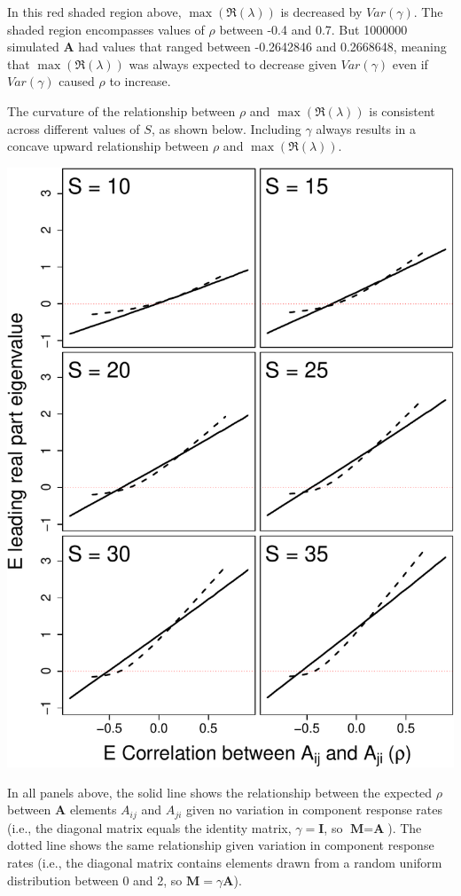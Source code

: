 \documentclass[]{article}
\begin{document}
In this red shaded region above, \(\max(\Re(\lambda))\) is decreased by
\(Var(\gamma)\). The shaded region encompasses values of \(\rho\)
between -0.4 and 0.7. But 1000000 simulated \(\textbf{A}\) had values
that ranged between -0.2642846 and 0.2668648, meaning that
\(\max(\Re(\lambda))\) was always expected to decrease given
\(Var(\gamma)\) even if \(Var(\gamma)\) caused \(\rho\) to increase.

The curvature of the relationship between \(\rho\) and
\(\max(\Re(\lambda))\) is consistent across different values of \(S\),
as shown below. Including \(\gamma\) always results in a concave upward
relationship between \(\rho\) and \(\max(\Re(\lambda))\).

\includegraphics{revision_notes_files/figure-latex/unnamed-chunk-13-1.pdf}

In all panels above, the solid line shows the relationship between the
expected \(\rho\) between \(\textbf{A}\) elements \(A_{ij}\) and
\(A_{ji}\) given no variation in component response rates (i.e., the
diagonal matrix equals the identity matrix, \(\gamma = \textbf{I}\), so
\(\textbf{M} = \textbf{A}\)). The dotted line shows the same
relationship given variation in component response rates (i.e., the
diagonal matrix contains elements drawn from a random uniform
distribution between 0 and 2, so \(\textbf{M} = \gamma\textbf{A}\)).
\end{document}
